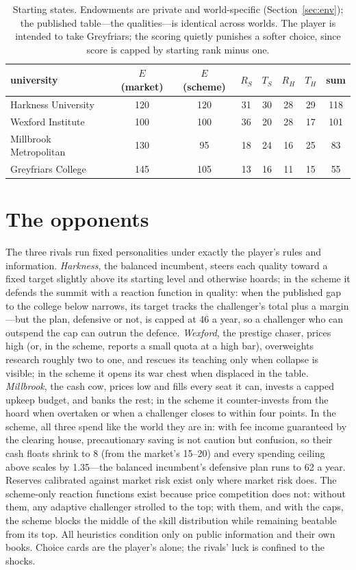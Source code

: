 \documentclass[11pt,a4paper]{article}
\begin{document}
\begin{table}[h]
\centering\small
\begin{tabular}{lccccccc}
\toprule
university & $E$ (market) & $E$ (scheme) & $R_S$ & $T_S$ & $R_H$ & $T_H$ & sum \\
\midrule
Harkness University    & 120 & 120 & 31 & 30 & 28 & 29 & 118 \\
Wexford Institute      & 100 & 100 & 36 & 20 & 28 & 17 & 101 \\
Millbrook Metropolitan & 130 & 95  & 18 & 24 & 16 & 25 & 83  \\
Greyfriars College     & 145 & 105 & 13 & 16 & 11 & 15 & 55  \\
\bottomrule
\end{tabular}
\caption{Starting states. Endowments are private and world-specific (Section~\ref{sec:env}); the published table---the qualities---is identical across worlds. The player is intended to take Greyfriars; the scoring quietly punishes a softer choice, since score is capped by starting rank minus one.}
\label{tab:start}
\end{table}

\section{The opponents}\label{app:ai}

The three rivals run fixed personalities under exactly the player's rules and information. \emph{Harkness}, the balanced incumbent, steers each quality toward a fixed target slightly above its starting level and otherwise hoards; in the scheme it defends the summit with a reaction function in quality: when the published gap to the college below narrows, its target tracks the challenger's total plus a margin---but the plan, defensive or not, is capped at 46 a year, so a challenger who can outspend the cap can outrun the defence. \emph{Wexford}, the prestige chaser, prices high (or, in the scheme, reports a small quota at a high bar), overweights research roughly two to one, and rescues its teaching only when collapse is visible; in the scheme it opens its war chest when displaced in the table. \emph{Millbrook}, the cash cow, prices low and fills every seat it can, invests a capped upkeep budget, and banks the rest; in the scheme it counter-invests from the hoard when overtaken or when a challenger closes to within four points. In the scheme, all three spend like the world they are in: with fee income guaranteed by the clearing house, precautionary saving is not caution but confusion, so their cash floats shrink to 8 (from the market's 15--20) and every spending ceiling above scales by 1.35---the balanced incumbent's defensive plan runs to 62 a year. Reserves calibrated against market risk exist only where market risk does. The scheme-only reaction functions exist because price competition does not: without them, any adaptive challenger strolled to the top; with them, and with the caps, the scheme blocks the middle of the skill distribution while remaining beatable from its top. All heuristics condition only on public information and their own books. Choice cards are the player's alone; the rivals' luck is confined to the shocks.
\end{document}
